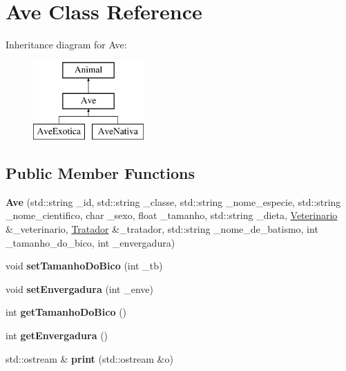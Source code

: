 \hypertarget{classAve}{}\section{Ave Class Reference}
\label{classAve}
Inheritance diagram for Ave\+:\begin{figure}[H]
\begin{center}
\leavevmode
\includegraphics[height=3.000000cm]{classAve}
\end{center}
\end{figure}
\subsection*{Public Member Functions}
\begin{DoxyCompactItemize}
\item 
\mbox{\label{classAve_a7c147f6153c466ae6a744ffd1c3aa380}} 
{\bfseries Ave} (std\+::string \+\_\+id, std\+::string \+\_\+classe, std\+::string \+\_\+nome\+\_\+especie, std\+::string \+\_\+nome\+\_\+cientifico, char \+\_\+sexo, float \+\_\+tamanho, std\+::string \+\_\+dieta, \hyperlink{classVeterinario}{Veterinario} \&\+\_\+veterinario, \hyperlink{classTratador}{Tratador} \&\+\_\+tratador, std\+::string \+\_\+nome\+\_\+de\+\_\+batismo, int \+\_\+tamanho\+\_\+do\+\_\+bico, int \+\_\+envergadura)
\item 
\mbox{\label{classAve_a5fb81fec98f756fdaae84e0ed31df7fa}} 
void {\bfseries set\+Tamanho\+Do\+Bico} (int \+\_\+tb)
\item 
\mbox{\label{classAve_a1384b352a4844d546258124d6f353532}} 
void {\bfseries set\+Envergadura} (int \+\_\+enve)
\item 
\mbox{\label{classAve_ac0c89141e2670b7f7f827327ba97aafe}} 
int {\bfseries get\+Tamanho\+Do\+Bico} ()
\item 
\mbox{\label{classAve_acf18daa406f41e12d4cca32c7c451371}} 
int {\bfseries get\+Envergadura} ()
\item 
\mbox{\label{classAve_a9cb34958345b998e68804d0bcc44a6d0}} 
std\+::ostream \& {\bfseries print} (std\+::ostream \&o)
\end{DoxyCompactItemize}
